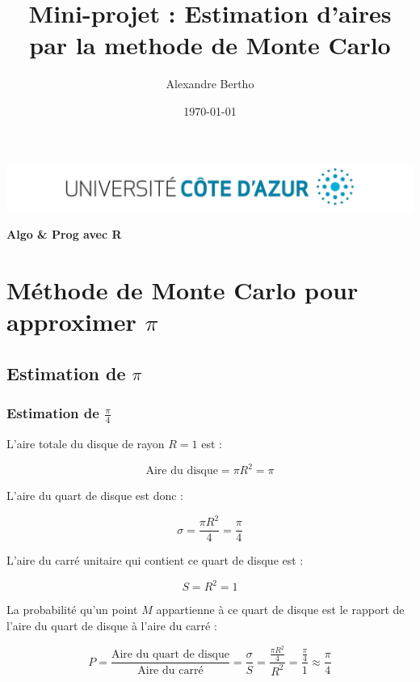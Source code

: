 \documentclass[a4paper,12pt]{article}
\title{Mini-projet : Estimation d'aires par la methode de Monte Carlo}
\author{Alexandre Bertho}
\date{\today}
\begin{document}
\begin{titlepage}
    \begin{center}
        \vspace*{1cm}
        \includegraphics[width=1\textwidth]{logo-univ.png}
        
        \textbf{\Large Algo \& Prog avec R}
        
        \vspace{0.5cm}
        \theauthor

        \vspace{1.5cm}
        \textbf{\Huge \thetitle}
        
        \vfill
        
        \large 
        \thedate
        
    \end{center}
\end{titlepage}

\section{Méthode de Monte Carlo pour approximer $\pi$}

\subsection{Estimation de $\pi$}

\subsubsection{Estimation de $\frac{\pi}{4}$}

L'aire totale du disque de rayon \( R = 1 \) est :

\[
\text{Aire du disque} = \pi R^2 = \pi
\]

L'aire du quart de disque est donc :

\[
\sigma = \frac{\pi R^2}{4} = \frac{\pi}{4}
\]

L'aire du carré unitaire qui contient ce quart de disque est :

\[
S = R^2 = 1
\]

La probabilité qu'un point \( M \) appartienne à ce quart de disque est le rapport de l'aire du quart de disque à l'aire du carré :

\[
P = \frac{\text{Aire du quart de disque}}{\text{Aire du carré}} = \frac{\sigma}{S} = \frac{\frac{\pi R^2}{4}}{R^2} = \frac{\frac{\pi}{4}}{1} \approx \frac{\pi}{4}
\]
\end{document}
